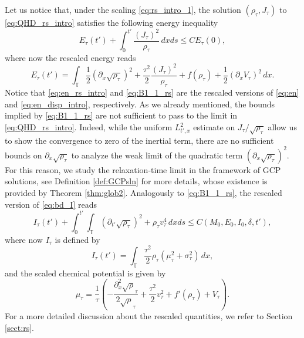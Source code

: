 \documentclass[leqno]{amsart}
\theoremstyle{plain}
\theoremstyle{definition}
\theoremstyle{remark}
\theoremstyle{plain}
\theoremstyle{plain}
\def\d{{\partial}}
\numberwithin{equation}{section}
\begin{document}
Let us notice that, under the scaling \eqref{eq:rs_intro_1}, the solution $(\rho_\tau, J_\tau)$ to \eqref{eq:QHD_rs_intro} satisfies the following energy inequality
\begin{equation}\label{eq:B1_1_rs}
E_\tau(t')+\int_0^{t'}\frac{(J_\tau)^2}{\rho_\tau}\,dxds\leq C E_\tau(0),
\end{equation}
where now the rescaled energy reads
\begin{equation}\label{eq:en_rs_intro}
E_\tau(t')=\int_{\mathbb T}\frac12(\d_x\sqrt{\rho_\tau})^2+\frac{\tau^2}{2}\frac{(J_\tau)^2}{\rho_\tau}+f(\rho_\tau)+
\frac12(\d_xV_\tau)^2\,dx.
\end{equation}
Notice that \eqref{eq:en_rs_intro} and \eqref{eq:B1_1_rs} are the rescaled versions of \eqref{eq:en} and \eqref{eq:en_disp_intro}, respectively.
\newline
As we already mentioned, the bounds implied by \eqref{eq:B1_1_rs} are not sufficient to pass to the limit in \eqref{eq:QHD_rs_intro}. Indeed, while the uniform $L^2_{t', x}$ estimate on $J_\tau/\sqrt{\rho_\tau}$ allow us to show the convergence to zero of the inertial term, there are no sufficient bounds on $\d_x\sqrt{\rho_\tau}$ to analyze the weak limit of the quadratic term $(\d_x\sqrt{\rho_\tau})^2$. For this reason, we study the relaxation-time limit in the framework of GCP solutions, see Definition \ref{def:GCPsln} for more details, whose existence is provided by Theorem \ref{thm:glob2}. 
Analogously to \eqref{eq:B1_1_rs}, the rescaled version of \eqref{eq:bd_I} reads 
\begin{equation}\label{eq:bd_I_rs}
I_\tau(t')+\int_0^{t'}\int_{\mathbb T}(\d_{t'}\sqrt{\rho_\tau})^2+\rho_\tau v_\tau^4\,dxds\leq 
C(M_0, E_0, I_0, \delta, t'),
\end{equation}
where now $I_\tau$ is defined by
\begin{equation}\label{eq:higher_rs_intro}
I_\tau(t')=\int_{\mathbb T}\frac{\tau^2}{2}\rho_\tau\left(\mu_\tau^2+\sigma_\tau^2\right)\,dx,
\end{equation}
and the scaled chemical potential is given by 
\begin{equation}\label{eq:chem_rs_intro}
\mu_\tau=\frac{1}{\tau}\left(-\frac{\d_x^2\sqrt\rho_\tau}{2\sqrt\rho_\tau}+\frac{\tau^2}{2}v_\tau^2+f'(\rho_\tau)+V_\tau\right).
\end{equation}
For a more detailed discussion about the rescaled quantities, we refer to Section \ref{sect:rs}.
\end{document}
